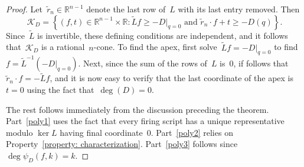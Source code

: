\documentclass{amsart}
\newcommand{\R}{\mathbb{R}}
\newcommand{\tL}{\tilde{L}}
\newcommand{\K}{\mathcal{K}}
\begin{document}
\begin{proof} Let~$\tilde{r}_n\in\R^{n-1}$ denote the last row of~$L$ with its
  last entry removed. Then
\begin{equation}
  \label{eqn: K_D}
  \K_D = \left\{ (f,t)\in\R^{n-1}\times\R: \tL f\geq -D|_{q=0}\text{ and
  }\tilde{r}_n\cdot f+t\geq-D(q)\right\}.  
\end{equation}
Since~$\tL$ is invertible, these defining conditions are independent, and it
follows that~$\K_D$ is a rational~$n$-cone. To find the apex, first
solve~$\tL f=-D|_{q=0}$ to find~$f=\tL^{-1}(-D|_{q=0})$.  Next, since the sum of the
  rows of~$L$ is~$0$, if follows that~$\tilde{r}_n\cdot f=-\tL f$, and it is now
  easy to verify that the last coordinate of the apex is~$t=0$ using the fact
  that~$\deg(D)=0$.

The rest follows immediately from the discussion preceding the theorem.
Part~\ref{poly1} uses the fact that every firing script has a unique
representative modulo $\ker L$ having final coordinate~$0$.  Part~\ref{poly2}
relies on Property~\ref{property: characterization}.  Part~\ref{poly3} follows
since~$\deg\psi_D(f,k)=k$.
\end{proof}

\end{document}
